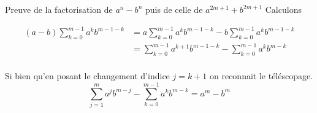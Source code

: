 \documentclass{article}
\begin{document}
\begin{question_kholle}{Preuve de la factorisation de $a^n - b^n$ puis de celle de $a^{2m+1} + b^{2m+1} $}
    Calculons 
    
    \begin{align*}
        (a-b)\sum_{k=0}^{m-1}a^{k}b^{m-1-k} 
        &=a \sum_{k=0}^{m-1}a^{k}b^{m-1-k} -b \sum_{k=0}^{m-1}a^{k}b^{m-1-k} \\
        &= \sum_{k=0}^{m-1}a^{k+1}b^{m-1-k} - \sum_{k=0}^{m-1}a^{k}b^{m-k} \\
    \end{align*}
    
    Si bien qu'en posant le changement d'indice $j = k + 1$ on reconnait le téléscopage.
    $$
    \sum_{j=1}^{m}a^{j}b^{m-j} - \sum_{k=0}^{m-1}a^{k}b^{m-k} = a^{m} - b ^{m}
    $$
\end{question_kholle}
\end{document}
